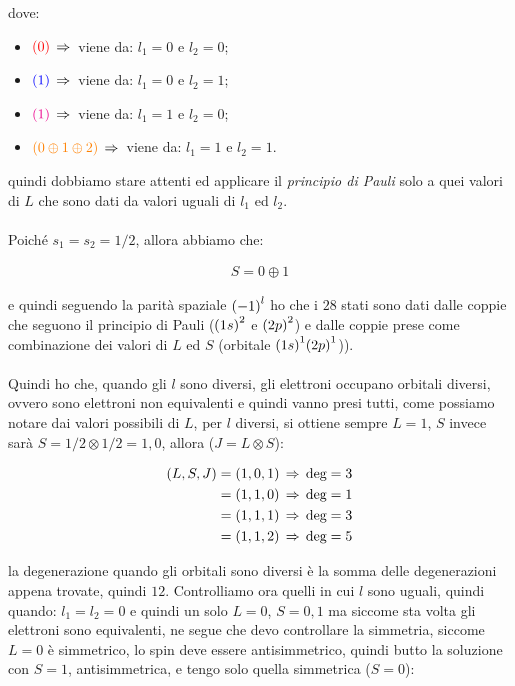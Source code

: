 \begin{itemize}
		dove:
		
	\begin{itemize}
		\item $\textcolor{red}{(0)} \, \Rightarrow \,$ viene da: $l_1 = 0$ e $l_2 = 0$;
		\item $\textcolor{blue}{(1)} \, \Rightarrow \,$ viene da: $l_1 = 0$ e $l_2 = 1$;
		\item $\textcolor{magenta}{(1)} \, \Rightarrow \,$ viene da: $l_1 = 1$ e $l_2 = 0$;
		\item $\textcolor{orange}{\qty( 0 \oplus 1 \oplus 2)} \, \Rightarrow \,$ viene da: $l_1 = 1$ e $l_2 = 1$.
	\end{itemize}

		quindi dobbiamo stare attenti ed applicare il \textit{principio di Pauli} solo a quei valori di $L$ che sono dati da valori uguali di $l_1$ ed $l_2$. 
		\\
		\\
		Poiché $s_1 = s_2 = 1/2$, allora abbiamo che:
		
	\begin{align*}
		S = 0 \oplus 1
	\end{align*}
	
		e quindi seguendo la parità spaziale $\qty(-1)^l$ ho che i $28$ stati sono dati dalle coppie che seguono il principio di Pauli ($\qty(1s)^2$ e $\qty(2p)^2$) e dalle coppie prese come combinazione dei valori di $L$ ed $S$ (orbitale $\qty(1s)^1 \qty(2p)^1$)).
		\\
		\\
		Quindi ho che, quando gli $l$ sono diversi, gli elettroni occupano orbitali diversi, ovvero sono elettroni non equivalenti e quindi vanno presi tutti, come possiamo notare dai valori possibili di $L$, per $l$ diversi, si ottiene sempre $L = 1$, $S$ invece sarà $S = 1/2 \otimes 1/2 = 1, 0$, allora ($J = L \otimes S$):
		
	\begin{align*}
		\qty(L, S, J) & = \qty(1, 0, 1) \, \Rightarrow \, \text{deg} = 3 \\ 
		& = \qty(1, 1, 0) \, \Rightarrow \, \text{deg} = 1 \\
		& = \qty(1, 1, 1) \, \Rightarrow \, \text{deg} = 3 \\
		& = \qty(1, 1, 2) \, \Rightarrow \, \text{deg} = 5 
	\end{align*}
	
		la degenerazione quando gli orbitali sono diversi è la somma delle degenerazioni appena trovate, quindi $12$. Controlliamo ora quelli in cui $l$ sono uguali, quindi quando: $l_1 = l_2  = 0$ e quindi un solo $L = 0$, $S = 0,1$ ma siccome sta volta gli elettroni sono equivalenti, ne segue che devo controllare la simmetria, siccome $L = 0$ è simmetrico, lo spin deve essere antisimmetrico, quindi butto la soluzione con $S = 1$, antisimmetrica, e tengo solo quella simmetrica ($S = 0$):
		

\end{itemize}
